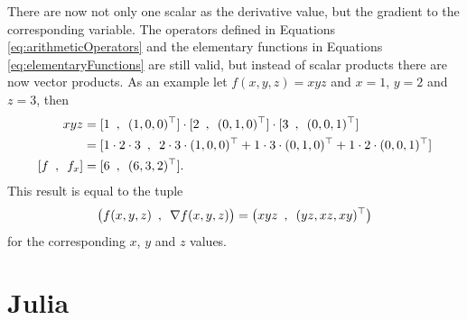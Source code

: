 There are now not only one scalar as the derivative value, but the gradient to the corresponding variable. The operators defined in Equations \ref{eq:arithmeticOperators} and the elementary functions in Equations \ref{eq:elementaryFunctions} are still valid, but instead of scalar products there are now vector products. As an example let $f(x,y,z) = xyz$ and $x = 1$, $y = 2$ and $z = 3$, then
\begin{align*}
    xyz &= [1\hspace{0.5em},\hspace{0.5em}(1,0,0)^\top]\cdot [2\hspace{0.5em},\hspace{0.5em}(0,1,0)^\top]\cdot
    [3\hspace{0.5em},\hspace{0.5em}(0,0,1)^\top] \\
    &=[1\cdot 2\cdot 3\hspace{0.5em},\hspace{0.5em}2\cdot3\cdot(1,0,0)^\top + 1\cdot3\cdot(0,1,0)^\top + 1\cdot2\cdot(0,0,1)^\top] \\
    [f\hspace{0.5em},\hspace{0.5em}f_x] &= [6\hspace{0.5em},\hspace{0.5em}(6,3,2)^\top].
\end{align*}
This result is equal to the tuple
\begin{equation*}
    \big(f(x,y,z) \hspace{0.5em},\hspace{0.5em} \nabla f(x,y,z)\big) = \big(xyz \hspace{0.5em},\hspace{0.5em} (yz,xz,xy)^\top\big)
\end{equation*}
for the corresponding $x$, $y$ and $z$ values. \\


\section{Julia}

















